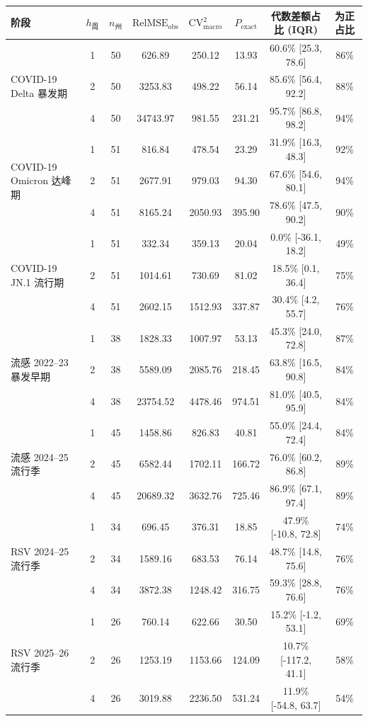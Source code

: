 \begin{tabular}{lccccccc}
\toprule
阶段 & $h_{\text{周}}$ & $n_{\text{州}}$ & $\text{RelMSE}_{\text{obs}}$ & $\text{CV}^2_{\text{macro}}$ & $P_{\text{exact}}$ & 代数差额占比 (IQR) & 为正占比 \\
\midrule
\multirow{3}{*}{COVID-19 Delta 暴发期} & 1 & 50 & 626.89 & 250.12 & 13.93 & 60.6\% [25.3, 78.6] & 86\% \\
 & 2 & 50 & 3253.83 & 498.22 & 56.14 & 85.6\% [56.4, 92.2] & 88\% \\
 & 4 & 50 & 34743.97 & 981.55 & 231.21 & 95.7\% [86.8, 98.2] & 94\% \\
\midrule
\multirow{3}{*}{COVID-19 Omicron 达峰期} & 1 & 51 & 816.84 & 478.54 & 23.29 & 31.9\% [16.3, 48.3] & 92\% \\
 & 2 & 51 & 2677.91 & 979.03 & 94.30 & 67.6\% [54.6, 80.1] & 94\% \\
 & 4 & 51 & 8165.24 & 2050.93 & 395.90 & 78.6\% [47.5, 90.2] & 90\% \\
\midrule
\multirow{3}{*}{COVID-19 JN.1 流行期} & 1 & 51 & 332.34 & 359.13 & 20.04 & 0.0\% [-36.1, 18.2] & 49\% \\
 & 2 & 51 & 1014.61 & 730.69 & 81.02 & 18.5\% [0.1, 36.4] & 75\% \\
 & 4 & 51 & 2602.15 & 1512.93 & 337.87 & 30.4\% [4.2, 55.7] & 76\% \\
\midrule
\multirow{3}{*}{流感 2022--23 暴发早期} & 1 & 38 & 1828.33 & 1007.97 & 53.13 & 45.3\% [24.0, 72.8] & 87\% \\
 & 2 & 38 & 5589.09 & 2085.76 & 218.45 & 63.8\% [16.5, 90.8] & 84\% \\
 & 4 & 38 & 23754.52 & 4478.46 & 974.51 & 81.0\% [40.5, 95.9] & 84\% \\
\midrule
\multirow{3}{*}{流感 2024--25 流行季} & 1 & 45 & 1458.86 & 826.83 & 40.81 & 55.0\% [24.4, 72.4] & 84\% \\
 & 2 & 45 & 6582.44 & 1702.11 & 166.72 & 76.0\% [60.2, 86.8] & 89\% \\
 & 4 & 45 & 20689.32 & 3632.76 & 725.46 & 86.9\% [67.1, 97.4] & 89\% \\
\midrule
\multirow{3}{*}{RSV 2024--25 流行季} & 1 & 34 & 696.45 & 376.31 & 18.85 & 47.9\% [-10.8, 72.8] & 74\% \\
 & 2 & 34 & 1589.16 & 683.53 & 76.14 & 48.7\% [14.8, 75.6] & 76\% \\
 & 4 & 34 & 3872.38 & 1248.42 & 316.75 & 59.3\% [28.8, 76.6] & 76\% \\
\midrule
\multirow{3}{*}{RSV 2025--26 流行季} & 1 & 26 & 760.14 & 622.66 & 30.50 & 15.2\% [-1.2, 53.1] & 69\% \\
 & 2 & 26 & 1253.19 & 1153.66 & 124.09 & 10.7\% [-117.2, 41.1] & 58\% \\
 & 4 & 26 & 3019.88 & 2236.50 & 531.24 & 11.9\% [-54.8, 63.7] & 54\% \\
\bottomrule
\end{tabular}